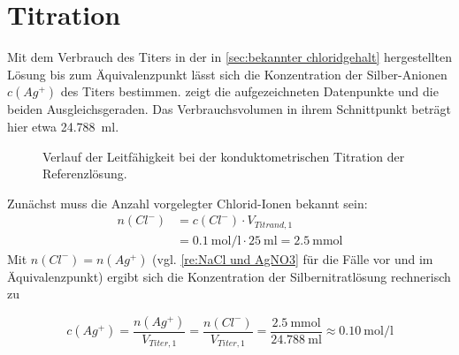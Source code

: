 	\section{Titration}
		Mit dem Verbrauch des Titers in der in \cref{sec:bekannter chloridgehalt} hergestellten Lösung bis zum Äquivalenzpunkt
		lässt sich die Konzentration der Silber-Anionen \(c(Ag^{+})\) des Titers bestimmen. 
		zeigt die aufgezeichneten Datenpunkte und die beiden Ausgleichsgeraden. Das Verbrauchsvolumen in ihrem Schnittpunkt beträgt hier etwa
		\SI{24,788}{\milli\litre}.
		\begin{figure}[h]
			\centering
			
			\caption[Verlauf der Leitfähigkeit der Referenzlösung]{Verlauf der Leitfähigkeit bei der konduktometrischen Titration der Referenzlösung.}
			\label{fig:verlauf leitf chloridlsgn}
		\end{figure}
		Zunächst muss die Anzahl vorgelegter Chlorid-Ionen bekannt sein:
		\begin{align}
			n(Cl^-) &= c(Cl^-) \cdot V_{Titrand,1}\nonumber\\
					&= \SI{0,1}{\mole\per\litre} \cdot \SI{25}{\milli\litre} = \SI{2,5}{\milli\mole}\label{eq:anzahl chloridionen}
		\end{align}
		Mit \(n(Cl^{-}) = n(Ag^{+})\) (vgl. \cref{re:NaCl und AgNO3} für die Fälle vor und im Äquivalenzpunkt) ergibt sich die Konzentration der Silbernitratlösung rechnerisch zu

		\begin{equation}
			c(Ag^+)	= \frac{n(Ag^+)}{V_{Titer,1}} = \frac{n(Cl^-)}{V_{Titer,1}} = \frac{\SI{2,5}{\milli\mole}}{\SI{24,788}{\milli\litre}} \approx \SI{0,10}{\mole\per\litre}
			\label{eq:konzentration silber gerechnet}
		\end{equation}

